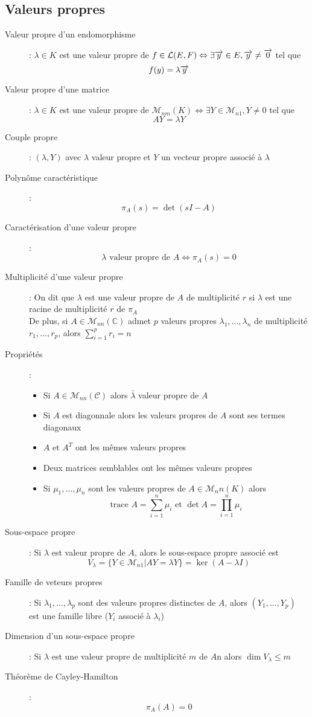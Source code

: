 \subsection{Valeurs propres}
\begin{description}
\item[Valeur propre d'un endomorphisme] : $\lambda\in K$ est une valeur propre de $f\in\mathcal L(E,F)\Leftrightarrow\exists\overrightarrow{y}\in E, \overrightarrow{y}\ne\overrightarrow{0}$ tel que
    \[ f(y)=\lambda\overrightarrow{y} \]
\item[Valeur propre d'une matrice] : $\lambda\in K$ est une valeur propre de $\mathcal M_{nm}(K)\Leftrightarrow\exists Y\in\mathcal M_{n1}, Y\ne 0$ tel que
    \[ AY=\lambda Y \]
\item[Couple propre] : $(\lambda, Y)$ avec $\lambda$ valeur propre et $Y$ un vecteur propre associé à $\lambda$
\item[Polynôme caractéristique] : \[ \pi_A(s)=\det(sI-A) \]
\item[Caractérisation d'une valeur propre] : 
    \[ \lambda\textrm{ valeur propre de } A\Leftrightarrow \pi_A(s)=0 \]
\item[Multiplicité d'une valeur propre] : 
    On dit que $\lambda$ est une valeur propre de $A$ de multiplicité $r$ si $\lambda$ est une racine de multiplicité $r$ de $\pi_A$\\
    De plus, si $A\in\mathcal M_{nn}(\mathbb C)$ admet $p$ valeurs propres $\lambda_1,\dots,\lambda_n$ de multiplicité $r_1,\dots,r_p$, alors
    $\sum_{i=1}^pr_i=n$
\item[Propriétés] :
\begin{itemize}
    \item Si $A\in\mathcal M_{nn}(\mathcal C)$ alors $\bar\lambda$ valeur propre de $A$
    \item Si $A$ est diagonnale alors les valeurs propres de $A$ sont ses termes diagonaux
    \item $A$ et $A^T$ ont les mêmes valeurs propres
    \item Deux matrices semblables ont les mêmes valeurs propres
    \item Si $\mu_1,\dots,\mu_n$ sont les valeurs propres de $A\in\mathcal M_nn(K)$ alors
        \[ \textrm{trace }A = \sum_{i=1}^n\mu_i\textrm{ et }\det A = \prod_{i=1}^n\mu_i \]
\end{itemize}
\item[Sous-espace propre] : Si $\lambda$ est valeur propre de $A$, alors le sous-espace propre associé est 
    \[ V_{\lambda}=\{Y\in\mathcal M_{n1} | AY=\lambda Y \}=\ker (A-\lambda I) \]
\item[Famille de veteurs propres] : Si $\lambda_1,\dots, \lambda_p$ sont des valeurs propres distinctes de $A$, alors $(Y_1,\dots,Y_p)$ est une famille libre
    ($Y_i$ associé à $\lambda_i$)
\item[Dimension d'un sous-espace propre] : Si $\lambda$ est une valeur propre de multiplicité $m$ de $A$n alors $\dim V_\lambda\le m$
\item[Théorème de Cayley-Hamilton] : \[ \pi_A(A)=0 \]
\end{description}
